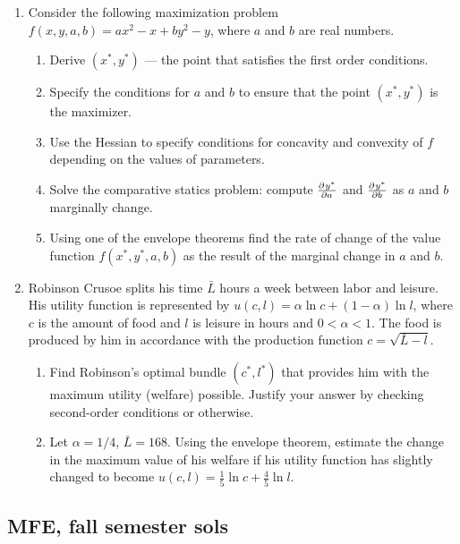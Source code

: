 \begin{enumerate}
\addtocounter{enumi}{6}
\item Consider the following maximization problem $f(x,y,a,b)=ax^2-x+by^2-y$, where $a$ and $b$ are real numbers.
\begin{enumerate}
\item Derive $(x^*,y^*)$ --- the point that satisfies the first order conditions.
\item Specify the conditions for $a$ and $b$ to ensure that the point $(x^*,y^*)$ is the maximizer.
\item Use the Hessian to specify conditions for concavity and convexity of $f$ depending on the values of parameters.
\item Solve the comparative statics problem: compute $\pd{y^*}{a}$ and $\pd{y^*}{b}$  as $a$ and $b$ marginally change.
\item Using one of the envelope theorems find the rate of change of the value function $f(x^*,y^*,a,b)$ as the result of the marginal change in $a$ and $b$.
\end{enumerate}

\item Robinson Crusoe splits his time $\bar{L}$ hours a week between labor and leisure. His utility function is represented by $u(c,l)=\alpha \ln c+(1-\alpha)\ln l$, where $c$ is the amount of food and $l$ is leisure in hours and $0<\alpha<1$. The food is produced by him in accordance with the production function $c=\sqrt{\bar{L}-l}$.
\begin{enumerate}
\item Find Robinson’s optimal bundle $(c^*,l^*)$ that provides him with the maximum utility (welfare) possible. Justify your answer by checking second-order conditions or otherwise.
\item Let $\alpha=1/4$, $\bar{L}=168$. Using the envelope theorem, estimate the change in the maximum value of his welfare if his utility function has slightly changed to become $u(c,l)=\frac{1}{5} \ln c+\frac{4}{5}\ln l$.
\end{enumerate}

\end{enumerate}

\subsection{MFE, fall semester sols}

